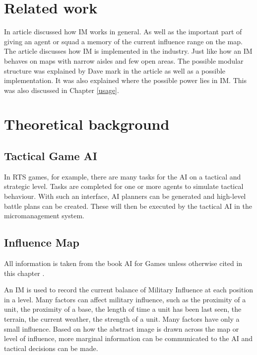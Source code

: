 \documentclass[]{report}
\begin{document}
	\chapter{Related work} \label{relatedwork}
	In \cite{10.5555/2821138} article discussed how \ac{IM} works in general. As well as the important part of giving an agent or squad a memory of the current influence range on the map.\newline \newline
	The article \citep{gameDevInfluenceMap} discusses how \ac{IM} is implemented in the industry. Just like how an \ac{IM} behaves on maps with narrow aisles and few open areas. \newline \newline
	The possible modular structure was explained by Dave mark in the article \citep{gameAIPro} as well as a possible implementation. It was also explained where the possible power lies in \ac{IM}. This was also discussed in Chapter \ref{usage}. 
	
	\chapter{Theoretical background} \label{theoreticalbackground}
	
	\section{Tactical Game AI}
	In \ac{RTS} games, for example, there are many tasks for the \ac{AI} on a tactical and strategic level. Tasks are completed for one or more agents to simulate tactical behaviour. With such an interface, \ac{AI} planners can be generated and high-level battle plans can be created. These will then be executed by the tactical \ac{AI} in the micromanagement system. \citep{tacticalGameAi} \newline
	
	
	\section{Influence Map}
	All information is taken from the book \ac{AI} for Games unless otherwise cited in this chapter \citep{AIforGamesTactical}.
	\newline
	
	An \ac{IM} is used to record the current balance of Military Influence at each position in a level. Many factors can affect military influence, such as the proximity of a unit, the proximity of a base, the length of time a unit has been last seen, the terrain, the current weather, the strength of a unit. Many factors have only a small influence. Based on how the abstract image is drawn across the map or level of influence, more marginal information can be communicated to the \ac{AI} and tactical decisions can be made.
	
\end{document}
